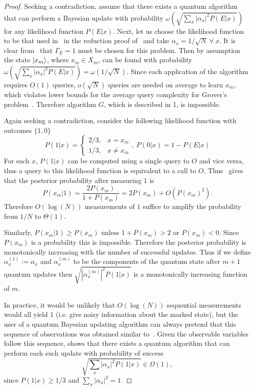 \documentclass[aps,amsmath,onecolumn,amssymb]{revtex4}
\begin{document}
\begin{proof}
Seeking a contradiction, assume that there exists a quantum algorithm that can perform a Bayesian update with probability $\omega(\sqrt{\sum_x |\alpha_x|^2 P(E|x)})$ for any likelihood function $P(E|x)$.  Next, let us choose the likelihood function to be that used in~ in the reduction proof of~ and take $\alpha_x =1/\sqrt{N}~\forall~x$.  It is clear from~ that $\Gamma_E =1$ must be chosen for this problem.  Then by assumption the state $\left|x_m\right\rangle$, where $x_m \in X_m$, can be found with probability $\omega(\sqrt{\sum_x |\alpha_x|^2 P(E|x)})= \omega(1/\sqrt{N})$.  Since each application of the algorithm requires $O(1)$ queries, $o(\sqrt{N})$ queries are needed on average to learn $x_m$, which violates lower bounds for the average query complexity for Grover's problem~\cite{BGH+96}.  Therefore algorithm $G$, which is described in 1, is impossible.


Again seeking a contradiction, consider the following likelihood function with outcomes $\{1,0\}$
\begin{equation}
P(1|x) = \begin{cases}
2/3, & x=x_m \\
1/3, & x\ne x_m
\end{cases},~P({0}|x) = 1-P(E|x)\label{eq:bayesgrover}
\end{equation}
For each $x$, $P(1|x)$ can be computed using a single query to $O$ and vice versa, thus a query to this likelihood function is equivalent to a call to $O$.
Thus~ gives that the posterior probability after measuring $1$ is
\begin{equation}
P(x_m|1)=\frac{2P(x_m)}{1 + P(x_m)}=2P(x_m) + O(P(x_m)^2).
\end{equation}
Therefore $O(\log(N))$ measurements of $1$ suffice to amplify the probability from $1/N$ to $\Theta(1)$.  

Similarly, $P(x_m|1) \ge P(x_m)$ unless $1+P(x_m) > 2$ or $P(x_m)<0$.  Since $P(x_m)$ is a probability this is impossible.  Therefore the posterior probability is monotonically increasing with the number of successful updates.  Thus if we define $\alpha^{(1)}_x:= \alpha_x$ and $\alpha_x^{(m)}$ to be the components of the quantum state after $m+1$ quantum updates then $\sqrt{|\alpha_x^{(m)}|^2 P(1|x)}$ is a  monotonically increasing function of $m$.

In practice, it would be unlikely that $O(\log(N))$ sequential measurements would all yield $1$ (i.e. give noisy information about the marked state), but the user of a quantum Bayesian updating algorithm can always pretend that this sequence of observations was obtained similar to~. 
Given the observable variables follow this sequence,  shows that 
there exists a quantum algorithm that can perform each such update with probability of success
\begin{equation}
\sqrt{\sum_x |\alpha_x|^2 P(1|x)} \in \Omega(1),\label{eq:Pfail}
\end{equation}
since $P(1|x) \ge 1/3$ and $\sum_x |\alpha_x|^2 =1$.


\end{proof}
\end{document}
